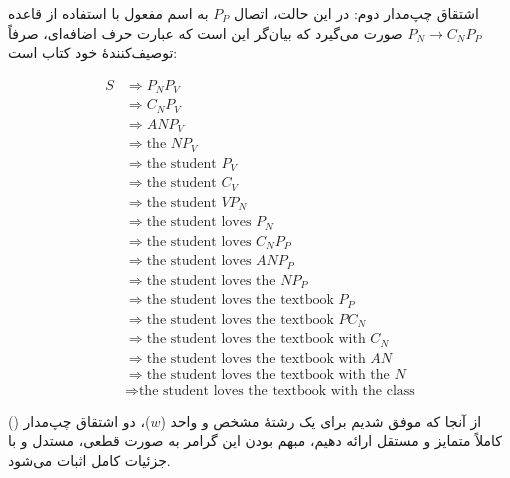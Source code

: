 اشتقاق چپ‌مدار دوم:
در این حالت، اتصال $P_P$ به اسم مفعول با استفاده از قاعده $P_N \rightarrow C_N P_P$ صورت می‌گیرد که بیان‌گر این است که عبارت حرف اضافه‌ای، صرفاً توصیف‌کنندهٔ خود کتاب است:

\begin{latin}
\begin{align*}
S & \Rightarrow P_N P_V \\
  & \Rightarrow C_N P_V \\
  & \Rightarrow A N P_V \\
  & \Rightarrow \text{the } N P_V \\
  & \Rightarrow \text{the student } P_V \\
  & \Rightarrow \text{the student } C_V \\
  & \Rightarrow \text{the student } V P_N \\
  & \Rightarrow \text{the student loves } P_N \\
  & \Rightarrow \text{the student loves } C_N P_P \\
  & \Rightarrow \text{the student loves } A N P_P \\
  & \Rightarrow \text{the student loves the } N P_P \\
  & \Rightarrow \text{the student loves the textbook } P_P \\
  & \Rightarrow \text{the student loves the textbook } P C_N \\
  & \Rightarrow \text{the student loves the textbook with } C_N \\
  & \Rightarrow \text{the student loves the textbook with } A N \\
  & \Rightarrow \text{the student loves the textbook with the } N \\
  & \Rightarrow \text{the student loves the textbook with the class}
\end{align*}
\end{latin}

از آنجا که موفق شدیم برای یک رشتهٔ مشخص و واحد ($w$)، دو اشتقاق چپ‌مدار () کاملاً متمایز و مستقل ارائه دهیم، مبهم بودن این گرامر به صورت قطعی، مستدل و با جزئیات کامل اثبات می‌شود.
